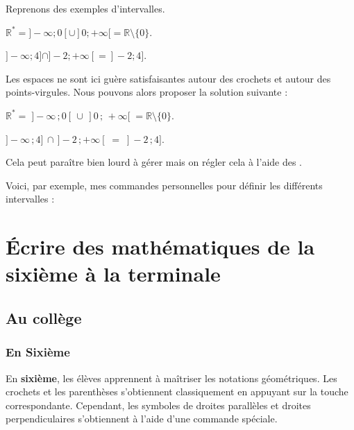 Reprenons des exemples d'intervalles.\bigskip

{
\begin{SideBySideExample}
    $\mathds R^*=]-\infty ; 0[ \cup ]0 ; +\infty[ =
    \mathds R \setminus \{0\}$.\par\medskip
    $]-\infty ; 4] \cap ]-2 ; +\infty[ = ]-2 ; 4]$.
\end{SideBySideExample}
}\bigskip

Les espaces ne sont ici guère satisfaisantes autour des crochets et autour des points-virgules. Nous pouvons alors proposer la solution suivante :\bigskip

{
\begin{SideBySideExample}
    $\mathds R^*=\; ]-\infty\, ; 0[\, \cup\,
                    ]0\, ;\, +\infty[\;
    =\mathds R \setminus \{0\}$.\par\medskip
    $]-\infty\, ; 4]\, \cap\, ]-2\, ; +\infty[ \;
    =\; ]-2\, ; 4]$.
\end{SideBySideExample}
}\bigskip

\begin{info}
    Cela peut paraître bien lourd à gérer mais on régler cela à l'aide des .
\end{info}

Voici, par exemple, mes commandes personnelles pour définir les différents intervalles :


\section{\'Ecrire des mathématiques de la sixième à la terminale}
\subsection{Au collège}

\subsubsection{En Sixième}

En \textbf{sixième}, les élèves apprennent à maîtriser les notations géométriques. Les crochets et les parenthèses s'obtiennent classiquement en appuyant sur la touche correspondante. Cependant, les symboles de droites parallèles et droites perpendiculaires s'obtiennent à l'aide d'une commande spéciale.

